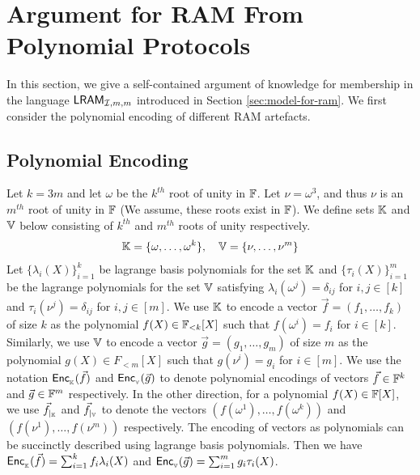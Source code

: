 \appendix

\section{Argument for RAM From Polynomial Protocols}\label{sec:poly-proto-ram-app}
In this section, we give a self-contained argument of knowledge for membership in the language
$\mathsf{LRAM}_{\mathcal{I},m,m}$ introduced in Section \ref{sec:model-for-ram}. We first consider the polynomial encoding
of different RAM artefacts.
\subsection{Polynomial Encoding}\label{subsec:poly-encoding}
Let $k=3m$ and let $\omega$ be the $k^{th}$ root of unity in $\mathbb{F}$.
Let $\nu=\omega^3$, and thus $\nu$ is an $m^{th}$ root of unity in $\mathbb{F}$ (We assume, these roots exist in $\mathbb{F}$).
We define sets $\mathbb{K}$ and $\mathbb{V}$ below consisting of $k^{th}$ and $m^{th}$ roots of unity respectively.
\begin{gather}\label{eq:interpolation-sets}
\mathbb{K} = \{\omega,\ldots,\omega^k\},\quad \mathbb{V} = \{\nu,\ldots,\nu^m\}
\end{gather}
Let $\{\lambda_i(X)\}_{i=1}^k$ be lagrange basis polynomials
for the set $\mathbb{K}$ and $\{\tau_i(X)\}_{i=1}^m$ be the lagrange polynomials for the set $\mathbb{V}$ satisfying
$\lambda_i(\omega^j)=\delta_{ij}$ for $i,j\in [k]$ and $\tau_i(\nu^j)=\delta_{ij}$ for $i,j\in [m]$.
We use $\mathbb{K}$ to encode a vector $\vec{f}=(f_1,\ldots,f_k)$ of size $k$ as the polynomial $f(X)\in \mathbb{F}_{<k}[X]$ such that $f(\omega^i)=f_i$ for $i\in [k]$.
Similarly, we use $\mathbb{V}$ to encode a vector
$\vec{g}=(g_1,\ldots,g_m)$ of size $m$ as the polynomial $g(X)\in F_{<m}[X]$ such that $g(\nu^i)=g_i$ for $i\in [m]$. We use
the notation $\mathsf{Enc}_{{}_{\mathbb{K}}}(\vec{f})$ and $\mathsf{Enc}_{{}_{\mathbb{V}}}(\vec{g})$ to denote polynomial encodings of vectors $\vec{f}\in \mathbb{F}^k$ and $\vec{g}\in \mathbb{F}^m$
respectively.
In the other direction, for a polynomial $f(X)\in \mathbb{F}[X]$,
we use $\vec{f}_{|_{\mathbb{K}}}$ and $\vec{f}_{|_{\mathbb{V}}}$ to denote the vectors $(f(\omega^1),\ldots,f(\omega^k))$ and $(f(\nu^1),\ldots,f(\nu^m))$ respectively.
The encoding of vectors as polynomials can be succinctly described using lagrange basis polynomials.
Then we have $\mathsf{Enc}_{{}_{\mathbb{K}}}(\vec{f})=\sum_{i=1}^k f_i\lambda_i(X)$ and $\mathsf{Enc}_{{}_{\mathbb{V}}}(\vec{g})=\sum_{i=1}^m g_i\tau_i(X)$.

